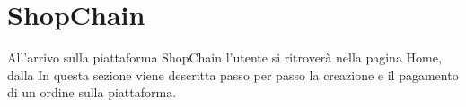 \section{ShopChain}

All'arrivo sulla piattaforma ShopChain l'utente si ritroverà nella pagina Home, dalla 
In questa sezione viene descritta passo per passo la creazione e il pagamento di un ordine sulla piattaforma.

